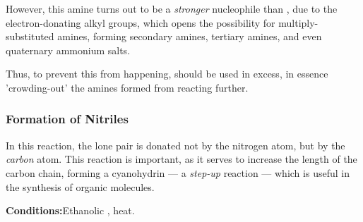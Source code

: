 

				However, this amine turns out to be a \textit{stronger} nucleophile than , due to the electron-donating alkyl groups,
				which opens the possibility for multiply-substituted amines, forming secondary amines, tertiary amines, and even
				quaternary ammonium salts.


				Thus, to prevent this from happening,  should be used in excess, in essence 'crowding-out' the amines formed
				from reacting further.




			\pagebreak
			\subsubsection{Formation of Nitriles}

				In this reaction, the lone pair is donated not by the nitrogen atom, but by the \textit{carbon} atom. This reaction is
				important, as it serves to increase the length of the carbon chain, forming a cyanohydrin --- a \textit{step-up}
				reaction --- which is useful in the synthesis of organic molecules.

				\vspace{1.5em}
				\vbox{\textbf{Conditions:}\tabto{35mm}Ethanolic , heat.}


